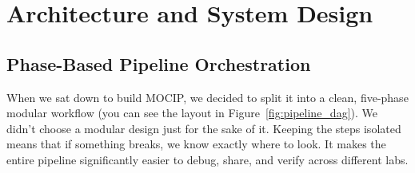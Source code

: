 \documentclass[runningheads]{llncs}
\begin{document}
\section{Architecture and System Design}

\subsection{Phase-Based Pipeline Orchestration}
When we sat down to build MOCIP, we decided to split it into a clean, five-phase modular workflow (you can see the layout in Figure~\ref{fig:pipeline_dag}). We didn't choose a modular design just for the sake of it. Keeping the steps isolated means that if something breaks, we know exactly where to look. It makes the entire pipeline significantly easier to debug, share, and verify across different labs.
\end{document}
